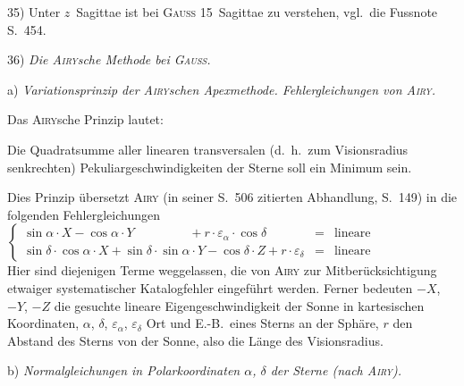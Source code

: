 \documentclass[12pt,a4paper]{article}
\theoremstyle{plain}
\theoremstyle{definition}
\theoremstyle{remark}
\begin{document}
\begin{small}
35) Unter $z$~Sagittae ist bei \textsc{Gauss} 15~Sagittae zu verstehen, vgl.~die
Fussnote S.~454.

36) \textit{Die \textsc{Airy}sche Methode bei \textsc{Gauss}.}

a) \textit{Variationsprinzip der \textsc{Airy}schen Apexmethode. Fehlergleichungen von
\textsc{Airy}.}

Das \textsc{Airy}sche Prinzip lautet:

Die Quadratsumme aller linearen transversalen (d.~h.~zum Visionsradius
senkrechten) Pekuliargeschwindigkeiten der Sterne soll ein Minimum sein.

Dies Prinzip \"ubersetzt \textsc{Airy} (in seiner S.~506 zitierten Abhandlung, S.~149) in
die folgenden Fehlergleichungen
\begin{equation}\tag{28}
\left\{\begin{array}{rcl}
\sin\alpha\cdot X - \cos\alpha\cdot Y\phantom{-\cos\delta\cdot Z} +
r\cdot\varepsilon_{\alpha}\cdot\cos\delta & = & \text{lineare Pekuliarbewegung im Parallel}\\
\sin\delta\cdot\cos\alpha\cdot X + \sin\delta\cdot\sin\alpha\cdot Y - \cos\delta\cdot Z +
r\cdot\varepsilon_{\delta} & = & \text{lineare Pekuliarbewegung in Deklination.}
\end{array}\right.\end{equation}
Hier sind diejenigen Terme weggelassen, die von \textsc{Airy} zur Mitber\"ucksichtigung
etwaiger systematischer Katalogfehler eingef\"uhrt werden. Ferner bedeuten
$-X$, $-Y$, $-Z$ die gesuchte lineare Eigengeschwindigkeit der Sonne in
kartesischen Koordinaten, $\alpha$, $\delta$, $\varepsilon_{\alpha}$, $\varepsilon_{\delta}$ Ort
und E.-B.~eines Sterns an der Sph\"are, $r$ den Abstand des Sterns von der Sonne,
also die L\"ange des Visionsradius.

b) \textit{Normalgleichungen in Polarkoordinaten $\alpha$, $\delta$ der Sterne (nach
\textsc{Airy}).}


\end{small}
\end{document}
